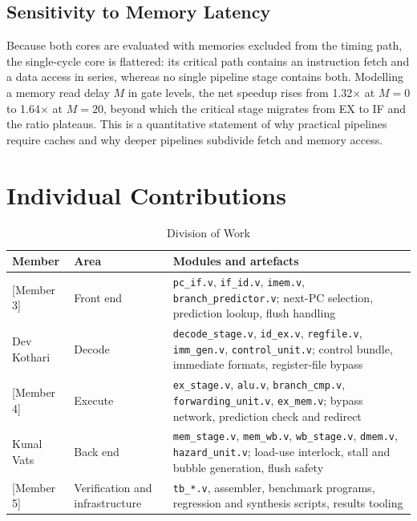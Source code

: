 \documentclass[conference]{IEEEtran}
\begin{document}
\subsection{Sensitivity to Memory Latency}

Because both cores are evaluated with memories excluded from the timing
path, the single-cycle core is flattered: its critical path contains an
instruction fetch and a data access in series, whereas no single pipeline
stage contains both. Modelling a memory read delay $M$ in gate levels, the
net speedup rises from 1.32$\times$ at $M=0$ to 1.64$\times$ at $M=20$,
beyond which the critical stage migrates from EX to IF and the ratio
plateaus. This is a quantitative statement of why practical pipelines
require caches and why deeper pipelines subdivide fetch and memory access.

\section{Individual Contributions}


\begin{table}[htbp]
\caption{Division of Work}
\begin{center}
\begin{tabular}{p{1.9cm}p{2.1cm}p{3.3cm}}
\toprule
\textbf{Member} & \textbf{Area} & \textbf{Modules and artefacts} \\
\midrule
{[Member 3]} & Front end &
\texttt{pc\_if.v}, \texttt{if\_id.v}, \texttt{imem.v},
\texttt{branch\_predictor.v}; next-PC selection, prediction lookup,
flush handling \\
\addlinespace
Dev Kothari & Decode &
\texttt{decode\_stage.v}, \texttt{id\_ex.v}, \texttt{regfile.v},
\texttt{imm\_gen.v}, \texttt{control\_unit.v}; control bundle,
immediate formats, register-file bypass \\
\addlinespace
{[Member 4]} & Execute &
\texttt{ex\_stage.v}, \texttt{alu.v}, \texttt{branch\_cmp.v},
\texttt{forwarding\_unit.v}, \texttt{ex\_mem.v}; bypass network,
prediction check and redirect \\
\addlinespace
Kunal Vats & Back end &
\texttt{mem\_stage.v}, \texttt{mem\_wb.v}, \texttt{wb\_stage.v},
\texttt{dmem.v}, \texttt{hazard\_unit.v}; load-use interlock, stall and
bubble generation, flush safety \\
\addlinespace
{[Member 5]} & Verification and infrastructure &
\texttt{tb\_*.v}, assembler, benchmark programs, regression and synthesis
scripts, results tooling \\
\bottomrule
\end{tabular}
\label{tab:contrib}
\end{center}
\end{table}
\end{document}
